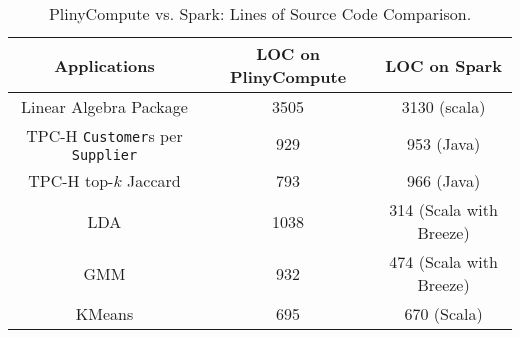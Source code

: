 \begin{table}[h!]
\begin{center}
\begin{tabular}{|c|c|c|}
\hline
Applications & LOC on PlinyCompute & LOC on Spark\\
\hline
Linear Algebra Package &3505& 3130 (scala)\\
TPC-H \texttt{Customer}s per \texttt{Supplier}&929 &953 (Java)\\
TPC-H top-$k$ Jaccard &793 & 966 (Java)\\
LDA &1038  &314 (Scala with Breeze)\\
GMM&932 & 474 (Scala with Breeze)\\
KMeans &695  &670 (Scala)\\
\hline
\end{tabular}
\caption{PlinyCompute vs. Spark: Lines of Source Code Comparison.}
\label{fig:LOC}
\end{center}
\end{table}



